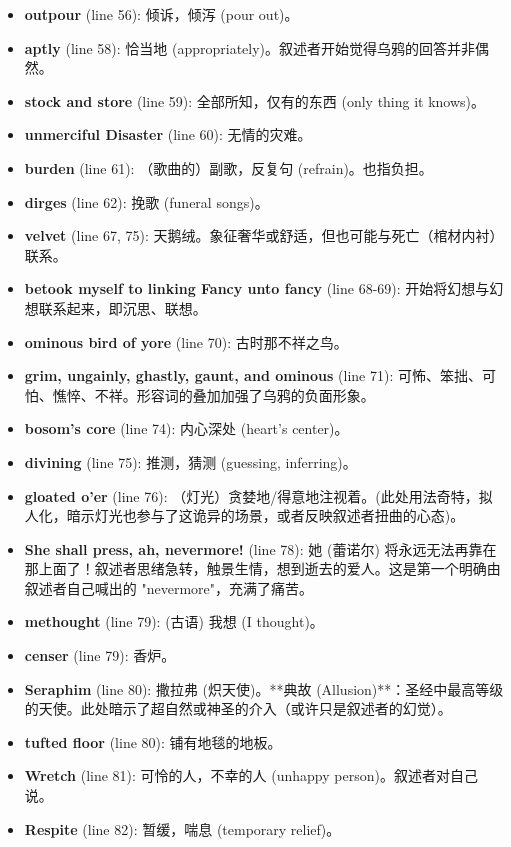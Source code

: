 \documentclass[12pt, a4paper]{article}
\begin{document}
\begin{itemize}
    \item \textbf{outpour} (line 56): 倾诉，倾泻 (pour out)。
    \item \textbf{aptly} (line 58): 恰当地 (appropriately)。叙述者开始觉得乌鸦的回答并非偶然。
    \item \textbf{stock and store} (line 59): 全部所知，仅有的东西 (only thing it knows)。
    \item \textbf{unmerciful Disaster} (line 60): 无情的灾难。
    \item \textbf{burden} (line 61): （歌曲的）副歌，反复句 (refrain)。也指负担。
    \item \textbf{dirges} (line 62): 挽歌 (funeral songs)。
    \item \textbf{velvet} (line 67, 75): 天鹅绒。象征奢华或舒适，但也可能与死亡（棺材内衬）联系。
    \item \textbf{betook myself to linking Fancy unto fancy} (line 68-69): 开始将幻想与幻想联系起来，即沉思、联想。
    \item \textbf{ominous bird of yore} (line 70): 古时那不祥之鸟。
    \item \textbf{grim, ungainly, ghastly, gaunt, and ominous} (line 71): 可怖、笨拙、可怕、憔悴、不祥。形容词的叠加加强了乌鸦的负面形象。
    \item \textbf{bosom's core} (line 74): 内心深处 (heart's center)。
    \item \textbf{divining} (line 75): 推测，猜测 (guessing, inferring)。
    \item \textbf{gloated o'er} (line 76): （灯光）贪婪地/得意地注视着。(此处用法奇特，拟人化，暗示灯光也参与了这诡异的场景，或者反映叙述者扭曲的心态)。
    \item \textbf{She shall press, ah, nevermore!} (line 78): 她 (蕾诺尔) 将永远无法再靠在那上面了！叙述者思绪急转，触景生情，想到逝去的爱人。这是第一个明确由叙述者自己喊出的 "nevermore"，充满了痛苦。
    \item \textbf{methought} (line 79): (古语) 我想 (I thought)。
    \item \textbf{censer} (line 79): 香炉。
    \item \textbf{Seraphim} (line 80): 撒拉弗 (炽天使)。**典故 (Allusion)**：圣经中最高等级的天使。此处暗示了超自然或神圣的介入（或许只是叙述者的幻觉）。
    \item \textbf{tufted floor} (line 80): 铺有地毯的地板。
    \item \textbf{Wretch} (line 81): 可怜的人，不幸的人 (unhappy person)。叙述者对自己说。
    \item \textbf{Respite} (line 82): 暂缓，喘息 (temporary relief)。

\end{itemize}
\end{document}
